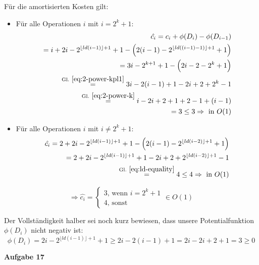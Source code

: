 \documentclass{article}
\begin{document}
Für die amortisierten Kosten gilt: 
\begin{itemize}
  \item Für alle Operationen $i$ mit $i=2^k+1$:\\
    \begin{align*}
    \hat{c_i} = c_i + \phi(D_i) - \phi(D_{i-1}) \\
    = i + 2i - 2^{\lfloor ld(i - 1) \rfloor + 1} + 1 - \left( 2(i - 1) - 2^{\lfloor ld((i - 1) - 1) \rfloor + 1} + 1 \right) \\
    = 3i - 2^{k + 1} + 1 - \left( 2i - 2 - 2^k + 1 \right) \\
    \stackrel{\mathrm{Gl.~\ref{eq:2-power-kpl1}}}= 3i - 2(i - 1) + 1 - 2i + 2 + 2^k - 1 \\
    \stackrel{\mathrm{Gl.~\ref{eq:2-power-k}}}= i - 2i + 2 + 1 + 2 - 1 + (i - 1) \\
    = 3 \leq 3 \Rightarrow\text{ in }O(1)
    \end{align*}
  \item Für alle Operationen $i$ mit $i\neq2^k+1$:\\
    \begin{align*}
    \hat{c_i} = 2 + 2i - 2^{\lfloor ld(i - 1) \rfloor + 1} + 1 - \left( 2(i - 1) - 2^{\lfloor ld(i - 2) \rfloor + 1} + 1 \right) \\
    = 2 + 2i - 2^{\lfloor ld(i - 1) \rfloor + 1} + 1 - 2i + 2 + 2^{\lfloor ld(i - 2) \rfloor + 1} - 1 \\
    \stackrel{\mathrm{Gl.~\ref{eq:ld-equality}}}= 4 \leq 4 \Rightarrow\text{ in }O(1)
    \end{align*}
\end{itemize}

\begin{equation}
\Longrightarrow \hat{c_i} = \begin{cases}3\text{, wenn }i = 2^k + 1 \\ 4\text{, sonst}\end{cases}\in O(1)
\end{equation}

Der Vollst{\"a}ndigkeit halber sei noch kurz bewiesen, dass unsere
Potentialfunktion $\phi(D_i)$ nicht negativ ist:
\begin{equation}
  \phi(D_i) = 2i - 2^{\lfloor ld(i - 1) \rfloor + 1} + 1 \geq 2i - 2(i - 1) + 1 = 2i - 2i + 2 + 1 = 3 \geq 0
\end{equation}

\clearpage

{\bfseries Aufgabe 17}%
\end{document}
